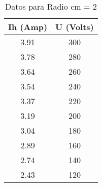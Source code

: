 \documentclass[a4paper,12pt]{report}
\begin{document}
    \begin{table}[h]
        \centering
        \begin{tabular}{|c|c|}
            \hline
            \textbf{Ih (Amp)} & \textbf{U (Volts)} \\ \hline
          3.91 & 300 \\ \hline
          3.78 & 280 \\ \hline
          3.64 & 260 \\ \hline
          3.54 & 240 \\ \hline
          3.37 & 220 \\ \hline
          3.19 & 200 \\ \hline
          3.04 & 180 \\ \hline
          2.89 & 160 \\ \hline
          2.74 & 140 \\ \hline
          2.43 & 120 \\ \hline
        \end{tabular}
        \caption{Datos para Radio cm = 2}
    \end{table}
\end{document}
